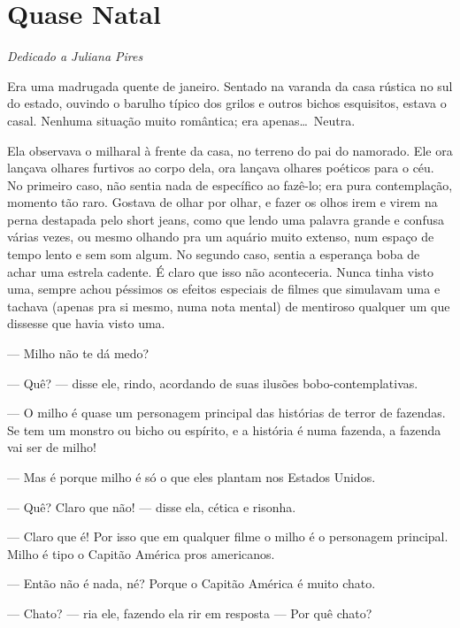 \chapter{Quase Natal}

\begin{flushright}
\emph{Dedicado a Juliana Pires}
\end{flushright}

Era uma madrugada quente de janeiro. Sentado na varanda da casa rústica no sul do estado, ouvindo o barulho típico dos grilos e outros bichos esquisitos, estava o casal. Nenhuma situação muito romântica; era apenas\ldots \ Neutra.

Ela observava o milharal à frente da casa, no terreno do pai do namorado. Ele ora lançava olhares furtivos ao corpo dela, ora lançava olhares poéticos para o céu. No primeiro caso, não sentia nada de específico ao fazê-lo; era pura contemplação, momento tão raro. Gostava de olhar por olhar, e fazer os olhos irem e virem na perna destapada pelo short jeans, como que lendo uma palavra grande e confusa várias vezes, ou mesmo olhando pra um aquário muito extenso, num espaço de tempo lento e sem som algum. No segundo caso, sentia a esperança boba de achar uma estrela cadente. É claro que isso não aconteceria. Nunca tinha visto uma, sempre achou péssimos os efeitos especiais de filmes que simulavam uma e tachava (apenas pra si mesmo, numa nota mental) de mentiroso qualquer um que dissesse que havia visto uma.

--- Milho não te dá medo?

--- Quê? --- disse ele, rindo, acordando de suas ilusões bobo-contemplativas.

--- O milho é quase um personagem principal das histórias de terror de fazendas. Se tem um monstro ou bicho ou espírito, e a história é numa fazenda, a fazenda vai ser de milho!

--- Mas é porque milho é só o que eles plantam nos Estados Unidos.

--- Quê? Claro que não! --- disse ela, cética e risonha.

--- Claro que é! Por isso que em qualquer filme o milho é o personagem principal. Milho é tipo o Capitão América pros americanos.

--- Então não é nada, né? Porque o Capitão América é muito chato.

--- Chato? --- ria ele, fazendo ela rir em resposta --- Por quê chato?


